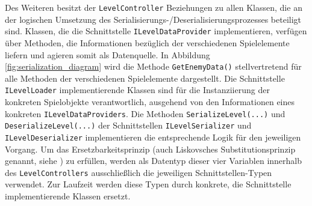 Des Weiteren besitzt der \texttt{LevelController} Beziehungen zu allen Klassen, die an der logischen Umsetzung des Serialisierungs-/Deserialisierungsprozesses beteiligt sind. Klassen, die die Schnittstelle \texttt{ILevelDataProvider} implementieren, verfügen über Methoden, die Informationen bezüglich der verschiedenen Spielelemente liefern und agieren somit als Datenquelle. In Abbildung \ref{fig:serialization_diagram} wird die Methode \texttt{GetEnemyData()} stellvertretend für alle Methoden der verschiedenen Spielelemente dargestellt. Die Schnittstelle \texttt{ILevelLoader} implementierende Klassen sind für die Instanziierung der konkreten Spielobjekte verantwortlich, ausgehend von den Informationen eines konkreten \texttt{ILevelDataProviders}. Die Methoden \texttt{SerializeLevel(...)} und \texttt{DeserializeLevel(...)} der Schnittstellen \texttt{ILevelSerializer} und \texttt{ILevelDeserializer} implementieren die entsprechende Logik für den jeweiligen Vorgang. Um das Ersetzbarkeitsprinzip (auch Liskovsches Substitutionsprinzip genannt, siehe \cite{Liskov_Substitution_Principle}) zu erfüllen, werden als Datentyp dieser vier Variablen innerhalb des \texttt{LevelControllers} ausschließlich die jeweiligen Schnittstellen-Typen verwendet. Zur Laufzeit werden diese Typen durch konkrete, die Schnittstelle implementierende Klassen ersetzt. 

